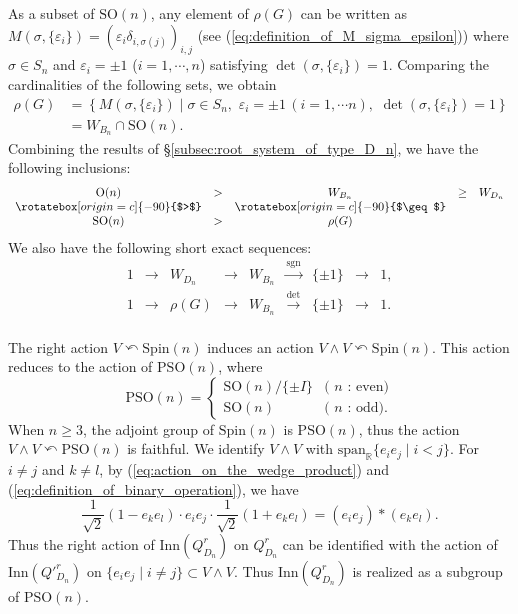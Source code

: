 \documentclass{amsart}
\theoremstyle{definition}
\theoremstyle{remark}
\numberwithin{equation}{section}
\begin{document}
As a subset of $\mathrm{SO}(n)$, 
any element of $\rho(G)$ can be written as 
$M(\sigma, \{ \varepsilon_i \} ) = (\varepsilon_i \delta_{i, \sigma(j)})_{i, j}$
(see (\ref{eq:definition_of_M_sigma_epsilon}))
where $\sigma \in S_n$ and $\varepsilon_i = \pm 1$ ($i = 1, \cdots , n$) 
satisfying $\det (\sigma , \{ \varepsilon_i \}) = 1$.
Comparing the cardinalities of the following sets, we obtain
\begin{equation}
\label{eq:rho_G}
\begin{split}
\rho(G) &= 
\left\{ M(\sigma , \{ \varepsilon_i \})
\mid \sigma \in S_n , \,\, \varepsilon_i = \pm 1 \, (i = 1, \cdots n) , \,\, 
\det (\sigma , \{ \varepsilon_i \}) = 1 \right\} \\
&= W_{B_n} \cap\mathrm{SO}(n).
\end{split}
\end{equation}
Combining the results of \S \ref{subsec:root_system_of_type_D_n}, 
we have the following inclusions:
\[
\begin{array}{ccccc}
 \mathrm{O}(n) & > & W_{B_n} & \geq & W_{D_n} \\
\rotatebox[origin=c]{-90}{$>$} & & \rotatebox[origin=c]{-90}{$\geq$} & & \\
\mathrm{SO}(n) & > & \rho(G)  \\
\end{array}
\]
We also have the following short exact sequences:
\begin{equation}
\label{eq:W_and_rho_G_as_kernels}
\begin{array}{ccccccccc}
1 & \to & W_{D_n} & \to & W_{B_n} & \xrightarrow{\mathrm{sgn}} & \{ \pm 1 \} & \to & 1 ,  \\
1 & \to & \rho(G) & \to & W_{B_n} & \xrightarrow{\mathrm{det}} & \{ \pm 1 \} & \to & 1 .  \\
\end{array}
\end{equation}

The right action $V \curvearrowleft \mathrm{Spin}(n)$ induces an action 
$V \wedge V \curvearrowleft \mathrm{Spin}(n)$.
This action reduces to the action of $\mathrm{PSO}(n)$, where 
\[
\mathrm{PSO}(n) = 
\begin{cases}
\mathrm{SO}(n)/ \{ \pm I \} & \textrm{( $n$ : even)} \\
\mathrm{SO}(n) & \textrm{( $n$ : odd)}.
\end{cases}
\]
When $n \geq 3$, the adjoint group of $\mathrm{Spin}(n)$ is $\mathrm{PSO}(n)$, 
thus the action $V \wedge V \curvearrowleft \mathrm{PSO}(n)$ is faithful. 
We identify $V \wedge V$ with $\mathrm{span}_{\mathbb{R}} \{ e_i e_j \mid i < j \}$.
For $i \neq j$ and $k \neq l$, by (\ref{eq:action_on_the_wedge_product}) and 
(\ref{eq:definition_of_binary_operation}),
we have
\[
\frac{1}{\sqrt{2}} (1 - e_k e_l) \cdot e_i e_j \cdot \frac{1}{\sqrt{2}} (1 + e_k e_l) 
= (e_i e_j) * (e_k e_l).
\]
Thus the right action of $\mathrm{Inn}(Q^r_{D_n})$ on $Q^r_{D_n}$ 
can be identified with the action of $\mathrm{Inn}(Q'^r_{D_n})$
on $\{ e_i e_j \mid i \neq j \}  \subset V \wedge V$.
Thus  $\mathrm{Inn}(Q^r_{D_n})$ is realized as a subgroup of $\mathrm{PSO}(n)$.
\end{document}
